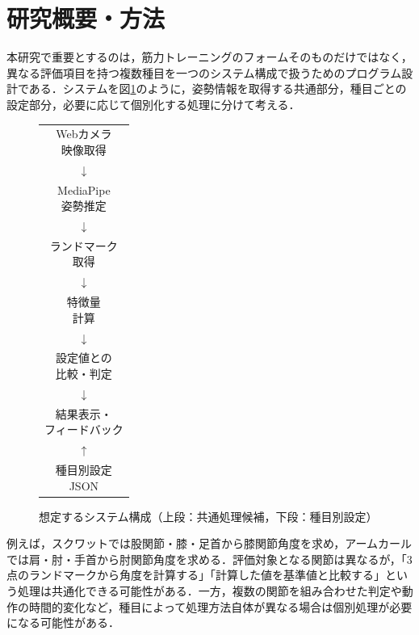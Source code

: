 \documentclass[no-page-number]{nanzan-abstract}
\begin{document}
\section{研究概要・方法}
本研究で重要とするのは，筋力トレーニングのフォームそのものだけではなく，異なる評価項目を持つ複数種目を一つのシステム構成で扱うためのプログラム設計である．システムを図\ref{fig:flow}のように，姿勢情報を取得する共通部分，種目ごとの設定部分，必要に応じて個別化する処理に分けて考える．

\begin{figure}[H]
  \centering
  \scriptsize
  \begin{tabular}{c}
    \fbox{\parbox{30mm}{\centering Webカメラ\\映像取得}}\\[-1mm]
    $\downarrow$\\[-1mm]
    \fbox{\parbox{30mm}{\centering MediaPipe\\姿勢推定}}\\[-1mm]
    $\downarrow$\\[-1mm]
    \fbox{\parbox{30mm}{\centering ランドマーク\\取得}}\\[-1mm]
    $\downarrow$\\[-1mm]
    \fbox{\parbox{30mm}{\centering 特徴量\\計算}}\\[-1mm]
    $\downarrow$\\[-1mm]
    \fbox{\parbox{30mm}{\centering 設定値との\\比較・判定}}\\[-1mm]
    $\downarrow$\\[-1mm]
    \fbox{\parbox{30mm}{\centering 結果表示・\\フィードバック}}\\[1mm]
    $\uparrow$\\[-1mm]
    \fbox{\parbox{30mm}{\centering 種目別設定\\JSON}}
  \end{tabular}
  \caption{想定するシステム構成（上段：共通処理候補，下段：種目別設定）}
  \label{fig:flow}
\end{figure}

例えば，スクワットでは股関節・膝・足首から膝関節角度を求め，アームカールでは肩・肘・手首から肘関節角度を求める．評価対象となる関節は異なるが，「3点のランドマークから角度を計算する」「計算した値を基準値と比較する」という処理は共通化できる可能性がある．一方，複数の関節を組み合わせた判定や動作の時間的変化など，種目によって処理方法自体が異なる場合は個別処理が必要になる可能性がある．
\end{document}
